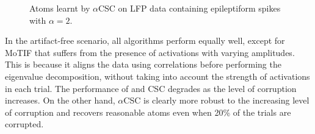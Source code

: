
\begin{figure}[b]
    \centering

            \caption[Atoms learnt by $\alpha$CSC on LFP data containing epileptiform spikes with $\alpha=2$.]{Atoms learnt by $\alpha$CSC on LFP data containing epileptiform spikes with $\alpha=2$.}
\end{figure}

In the artifact-free scenario, all algorithms perform equally well, except for MoTIF that suffers from the presence of activations with varying amplitudes. This is because it aligns the data using correlations before performing the eigenvalue decomposition, without taking into account the strength of activations in each trial. The performance of \citet{brockmeier2016learning} and CSC degrades as the level of corruption increases. On the other hand, $\alpha$CSC is clearly more robust to the increasing level of corruption and recovers reasonable atoms even when 20\% of the trials are corrupted. 




